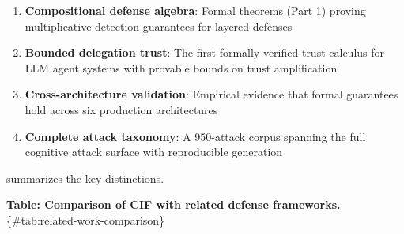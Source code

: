 \documentclass[
]{article}
\providecommand{\tightlist}{%
  \setlength{\itemsep}{0pt}\setlength{\parskip}{0pt}}
\begin{document}
\begin{enumerate}
\def\labelenumi{\arabic{enumi}.}
\tightlist
\item
  \textbf{Compositional defense algebra}: Formal theorems (Part 1)
  proving multiplicative detection guarantees for layered defenses
\item
  \textbf{Bounded delegation trust}: The first formally verified trust
  calculus for LLM agent systems with provable bounds on trust
  amplification
\item
  \textbf{Cross-architecture validation}: Empirical evidence that formal
  guarantees hold across six production architectures
\item
  \textbf{Complete attack taxonomy}: A 950-attack corpus spanning the
  full cognitive attack surface with reproducible generation
\end{enumerate}

 summarizes the key distinctions.

\textbf{Table: Comparison of CIF with related defense frameworks.}
\{\#tab:related-work-comparison\}
\end{document}
